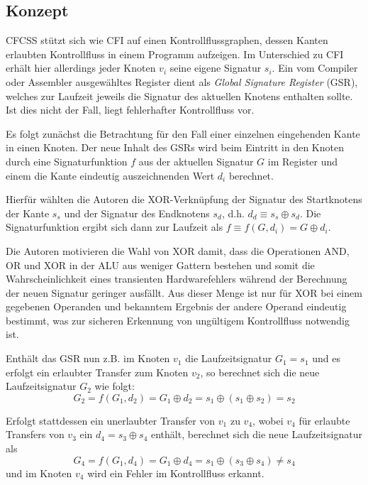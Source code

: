 \documentclass[11pt]{article}
\begin{document}
\subsection{Konzept}

CFCSS stützt sich wie CFI auf einen Kontrollflussgraphen, dessen Kanten
erlaubten Kontrollfluss in einem Programm aufzeigen. Im Unterschied zu CFI
erhält hier allerdings jeder Knoten $v_i$ seine eigene Signatur $s_i$. Ein vom
Compiler oder Assembler ausgewähltes Register dient als \emph{Global Signature
Register} (GSR), welches zur Laufzeit jeweils die Signatur des aktuellen
Knotens enthalten sollte. Ist dies nicht der Fall, liegt fehlerhafter
Kontrollfluss vor.

Es folgt zunächst die Betrachtung für den Fall einer einzelnen eingehenden
Kante in einen Knoten. Der neue Inhalt des GSRs wird beim Eintritt in den
Knoten durch eine Signaturfunktion $f$ aus der aktuellen Signatur $G$ im
Register und einem die Kante eindeutig auszeichnenden Wert $d_i$ berechnet.

Hierfür wählten die Autoren die XOR-Verknüpfung der Signatur des Startknotens
der Kante $s_s$ und der Signatur des Endknotens $s_d$, d.h. $d_d \equiv s_s
\oplus s_d$. Die Signaturfunktion ergibt sich dann zur Laufzeit als $f \equiv
f(G, d_i) = G \oplus d_i$.

Die Autoren motivieren die Wahl von XOR damit, dass die Operationen AND, OR und
XOR in der ALU aus weniger Gattern bestehen und somit die Wahrscheinlichkeit
eines transienten Hardwarefehlers während der Berechnung der neuen Signatur
geringer ausfällt. Aus dieser Menge ist nur für XOR bei einem gegebenen
Operanden und bekanntem Ergebnis der andere Operand eindeutig bestimmt, was zur
sicheren Erkennung von ungültigem Kontrollfluss notwendig ist.

Enthält das GSR nun z.B. im Knoten $ v_1 $ die Laufzeitsignatur $ G_1 = s_1 $ und
es erfolgt ein erlaubter Transfer zum Knoten $ v_2 $, so berechnet sich die neue
Laufzeitsignatur $ G_2 $ wie folgt: $$ G_2 = f(G_1, d_2) = G_1 \oplus d_2 = s_1
\oplus (s_1 \oplus s_2) = s_2 $$

Erfolgt stattdessen ein unerlaubter Transfer von $ v_1 $ zu $ v_4 $, wobei
$ v_4 $ für erlaubte Transfers von $ v_3 $ ein $ d_4 = s_3 \oplus s_4
$ enthält, berechnet sich die neue Laufzeitsignatur als $$ G_4 = f(G_1, d_4)
= G_1 \oplus d_4 = s_1 \oplus (s_3 \oplus s_4) \neq s_4 $$ und im Knoten $v_4$
wird ein Fehler im Kontrollfluss erkannt.
\end{document}
